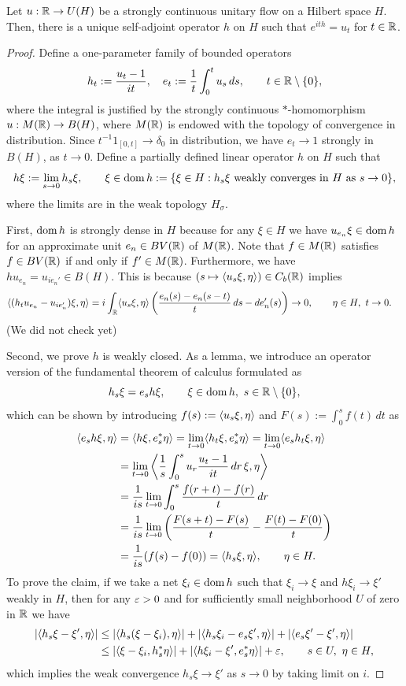 \documentclass{../../large}
\begin{document}
\begin{prb}
Let $u:\mathbb{R}\to U(H)$ be a strongly continuous unitary flow on a Hilbert space $H$.
Then, there is a unique self-adjoint operator $h$ on $H$ such that $e^{ith}=u_t$ for $t\in\mathbb{R}$.
\end{prb}
\begin{proof}
Define a one-parameter family of bounded operators
\[h_t:=\frac{u_t-1}{it},\quad e_t:=\frac1t\int_0^tu_s\,ds,\qquad t\in\mathbb{R}\setminus\{0\},\]
where the integral is justified by the strongly continuous $*$-homomorphism $u:M(\mathbb{R})\to B(H)$, where $M(\mathbb{R})$ is endowed with the topology of convergence in distribution.
Since $t^{-1}1_{[0,t]}\to\delta_0$ in distribution, we have $e_t\to1$ strongly in $B(H)$, as $t\to0$.
Define a partially defined linear operator $h$ on $H$ such that
\[h\xi:=\lim_{s\to0}h_s\xi,\qquad\xi\in\operatorname{dom} h:=\{\xi\in H:h_s\xi\text{ weakly converges in $H$ as $s\to0$}\},\]
where the limits are in the weak topology $H_\sigma$.


First, $\operatorname{dom} h$ is strongly dense in $H$ because for any $\xi\in H$ we have $u_{e_n}\xi\in\operatorname{dom} h$ for an approximate unit $e_n\in BV(\mathbb{R})$ of $M(\mathbb{R})$.
Note that $f\in M(\mathbb{R})$ satisfies $f\in BV(\mathbb{R})$ if and only if $f'\in M(\mathbb{R})$.
Furthermore, we have $hu_{e_n}=u_{ie_n'}\in B(H)$.
This is because $(s\mapsto\langle u_s\xi,\eta\rangle)\in C_b(\mathbb{R})$ implies
\begin{align*}
\langle(h_tu_{e_n}-u_{ie_n'})\xi,\eta\rangle
&=i\int_{\mathbb{R}}\langle u_s\xi,\eta\rangle\left(\frac{e_n(s)-e_n(s-t)}t\,ds-de_n'(s)\right)\to0,\qquad\eta\in H,\ t\to0.
\end{align*}
(We did not check yet)

Second, we prove $h$ is weakly closed.
As a lemma, we introduce an operator version of the fundamental theorem of calculus formulated as
\[h_s\xi=e_sh\xi,\qquad\xi\in\dom h,\ s\in\R\setminus\{0\},\]
which can be shown by introducing $f(s):=\langle u_s\xi,\eta\rangle$ and $F(s):=\int_0^sf(t)\,dt$ as
\begin{align*}
\langle e_sh\xi,\eta\rangle
&=\langle h\xi,e_s^*\eta\rangle=\lim_{t\to0}\langle h_t\xi,e_s^*\eta\rangle=\lim_{t\to0}\langle e_sh_t\xi,\eta\rangle\\
&=\lim_{t\to0}\left\langle\frac1s\int_0^su_r\frac{u_t-1}{it}\,dr\,\xi,\eta\right\rangle\\
&=\frac1{is}\lim_{t\to0}\int_0^s\frac{f(r+t)-f(r)}t\,dr\\
&=\frac1{is}\lim_{t\to0}\left(\frac{F(s+t)-F(s)}t-\frac{F(t)-F(0)}t\right)\\
&=\frac1{is}(f(s)-f(0))=\langle h_s\xi,\eta\rangle,\qquad\eta\in H.
\end{align*}
To prove the claim, if we take a net $\xi_i\in\operatorname{dom} h$ such that $\xi_i\to\xi$ and $h\xi_i\to\xi'$ weakly in $H$, then for any $\varepsilon>0$ and for sufficiently small neighborhood $U$ of zero in $\mathbb{R}$ we have
\begin{align*}
|\langle h_s\xi-\xi',\eta\rangle|
&\le|\langle h_s(\xi-\xi_i),\eta\rangle|+|\langle h_s\xi_i-e_s\xi',\eta\rangle|+|\langle e_s\xi'-\xi',\eta\rangle|\\
&\le|\langle\xi-\xi_i,h_s^*\eta\rangle|+|\langle h\xi_i-\xi',e_s^*\eta\rangle|+\varepsilon,\qquad s\in U,\ \eta\in H,
\end{align*}
which implies the weak convergence $h_s\xi\to\xi'$ as $s\to 0$ by taking limit on $i$.


\end{proof}
\end{document}
